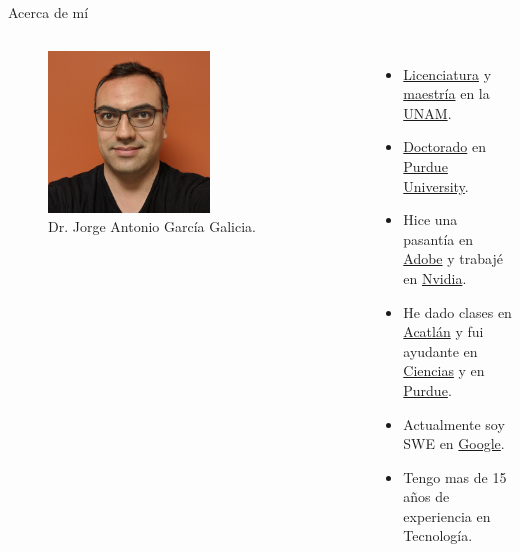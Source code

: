 \begin{frame}{Acerca de mí}
    \begin{columns}
        \begin{figure}[htb]
            \centering
            \includegraphics[width=0.6\textwidth]{img/Avatar12}
            \caption{Dr. Jorge Antonio García Galicia.}
        \end{figure}
     \begin{itemize}
         \item \href{https://mac.acatlan.unam.mx/}{Licenciatura} y \href{https://www.pcic.unam.mx/}{maestría} en la \href{https://www.unam.mx/}{UNAM}.
         \item \href{https://polytechnic.purdue.edu/degrees/phd-technology}{Doctorado} en \href{https://www.purdue.edu/}{Purdue University}.
         \item Hice una pasantía en \href{https://research.adobe.com/}{Adobe} y trabajé en \href{https://www.nvidia.com/}{Nvidia}.
         \item He dado clases en \href{https://www.acatlan.unam.mx/}{Acatlán} y fui ayudante en \href{https://www.fciencias.unam.mx/directorio/63922}{Ciencias} y en \href{https://polytechnic.purdue.edu/}{Purdue}.
         \item Actualmente soy SWE en \href{https://about.google/}{Google}.
         \item Tengo mas de 15 años de experiencia en Tecnología.
     \end{itemize}
\end{columns}
\end{frame}

